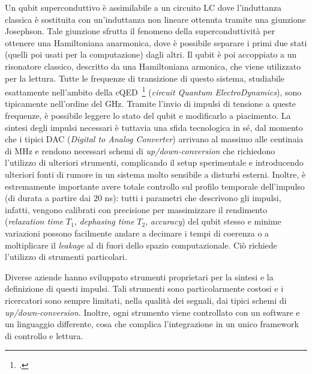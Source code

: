 \documentclass{article}
\begin{document}
Un qubit superconduttivo è assimilabile a un circuito LC dove l'induttanza classica è sostituita con un'induttanza non lineare ottenuta tramite una giunzione Josephson.
Tale giunzione sfrutta il fenomeno della superconduttività per ottenere una Hamiltoniana anarmonica, dove è possibile separare i primi due stati (quelli poi usati per la computazione) dagli altri.
Il qubit è poi accoppiato a un risonatore classico, descritto da una Hamiltoniana armonica, che viene utilizzato per la lettura.
%
Tutte le frequenze di transizione di questo sistema, studiabile esattamente nell'ambito della cQED~\footcite{Blais2021} (\textit{circuit Quantum ElectroDynamics}), sono tipicamente nell'ordine del GHz.
%
Tramite l'invio di impulsi di tensione a queste frequenze, è possibile leggere lo stato del qubit e modificarlo a piacimento.
%
La sintesi degli impulsi necessari è tuttavia una sfida tecnologica in sé, dal momento che i tipici DAC (\textit{Digital to Analog Converter}) arrivano al massimo alle centinaia di MHz e rendono necessari schemi di \textit{up/down-conversion} che richiedono l'utilizzo di ulteriori strumenti, complicando il setup sperimentale e introducendo ulteriori fonti di rumore in un sistema molto sensibile a disturbi esterni.
%
Inoltre, è estremamente importante avere totale controllo sul profilo temporale dell'impulso (di durata a partire dai $20$ ns): tutti i parametri che descrivono gli impulsi, infatti, vengono calibrati con precisione per massimizzare il rendimento (\textit{relaxation time} $T_1$, \textit{dephasing time} $T_2$, \textit{accuracy}) del qubit stesso e minime variazioni possono facilmente andare a decimare i tempi di coerenza o a moltiplicare il \textit{leakage} al di fuori dello spazio computazionale.
Ciò richiede l'utilizzo di strumenti particolari.

Diverse aziende hanno sviluppato strumenti proprietari per la sintesi e la definizione di questi impulsi.
Tali strumenti sono particolarmente costosi e i ricercatori sono sempre limitati, nella qualità dei segnali, dai tipici schemi di \textit{up/down-conversion}.
Inoltre, ogni strumento viene controllato con un software e un linguaggio differente, cosa che complica l'integrazione in un unico framework di controllo e lettura.
\end{document}
